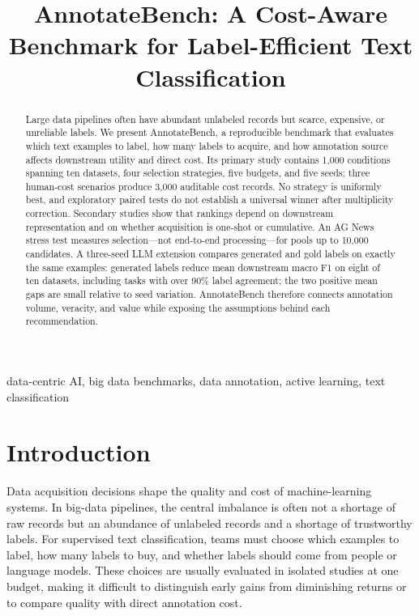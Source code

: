 \documentclass[conference]{IEEEtran}
\title{AnnotateBench: A Cost-Aware Benchmark for Label-Efficient Text Classification}
\author{
\IEEEauthorblockN{Aitong Zhang, Natan Vidra, Spurthi Setty}
\IEEEauthorblockA{\textit{Anote AI}\\
USA\\
\{az535@cornell.edu, nvidra@anote.ai, ssetty2@stevens.edu\}}
}
\begin{document}
\maketitle

\begin{abstract}
Large data pipelines often have abundant unlabeled records but scarce, expensive, or unreliable labels. We present AnnotateBench, a reproducible benchmark that evaluates which text examples to label, how many labels to acquire, and how annotation source affects downstream utility and direct cost. Its primary study contains 1,000 conditions spanning ten datasets, four selection strategies, five budgets, and five seeds; three human-cost scenarios produce 3,000 auditable cost records. No strategy is uniformly best, and exploratory paired tests do not establish a universal winner after multiplicity correction. Secondary studies show that rankings depend on downstream representation and on whether acquisition is one-shot or cumulative. An AG News stress test measures selection---not end-to-end processing---for pools up to 10,000 candidates. A three-seed LLM extension compares generated and gold labels on exactly the same examples: generated labels reduce mean downstream macro F1 on eight of ten datasets, including tasks with over 90\% label agreement; the two positive mean gaps are small relative to seed variation. AnnotateBench therefore connects annotation volume, veracity, and value while exposing the assumptions behind each recommendation.
\end{abstract}

\begin{IEEEkeywords}
data-centric AI, big data benchmarks, data annotation, active learning, text classification
\end{IEEEkeywords}

\section{Introduction}

Data acquisition decisions shape the quality and cost of machine-learning systems. In big-data pipelines, the central imbalance is often not a shortage of raw records but an abundance of unlabeled records and a shortage of trustworthy labels. For supervised text classification, teams must choose which examples to label, how many labels to buy, and whether labels should come from people or language models. These choices are usually evaluated in isolated studies at one budget, making it difficult to distinguish early gains from diminishing returns or to compare quality with direct annotation cost.
\end{document}
